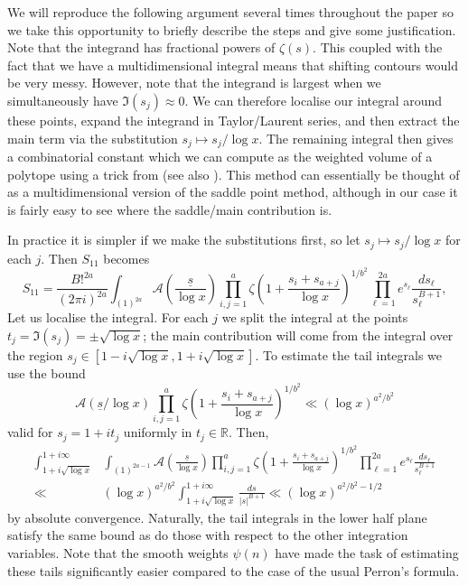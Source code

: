 \documentclass[oneside, 12pt]{amsart}
\theoremstyle{definition}
\newcommand{\mc}{\mathcal}
\newcommand{\ul}{\underline}
\begin{document}
We will reproduce the following argument several times throughout the paper so we take this opportunity to briefly describe the steps and give some justification. Note that the integrand has fractional powers of $\zeta(s)$. This coupled with the fact that we have a multidimensional integral means that shifting contours would be very messy. However, note that the integrand is largest when we simultaneously have  $\Im(s_j)\approx 0$. We can therefore localise our integral around these points, expand the integrand in Taylor/Laurent series, and then extract the main term via the substitution $s_j\mapsto s_j/\log x$. The remaining integral then gives a combinatorial constant which we can compute as the weighted volume of a polytope using a trick from \cite{BH} (see also \cite{HL}). This method can essentially be thought of as a multidimensional version of the saddle point method, although in our case it is fairly easy to see where the saddle/main contribution is.

In practice it is simpler if we make the substitutions first, so let $s_j\mapsto s_j/\log x$ for each $j$. Then $ S_{11}$ becomes
\[
 S_{11}=\frac{B!^{2a}}{(2\pi i)^{2a}}\int_{(1)^{2a}}
  \mc{A}(\frac{\ul{s}}{\log x}) 
 \prod_{i,j=1}^a\zeta\left(1+\frac{s_i+s_{a+j}}{\log x}\right)^{1/b^2} 
 \prod_{\ell=1}^{2a}e^{s_\ell}\frac{ds_\ell}{s_\ell^{B+1}},  
\]
Let us localise the integral. For each $j$ we split the integral at the points $t_j=\Im(s_j)=\pm\sqrt{\log x}$; the main contribution will come from the integral over the region $s_j\in [1 - i\sqrt{\log x}, 1 + i\sqrt{\log x}]$. To estimate the tail integrals we use the bound
\[
 \mc{A}(\ul{s}/\log x)\prod_{i,j=1}^a \zeta\left(1+\frac{s_i+s_{a+j}}{\log x}\right)^{1/b^2}\ll (\log x)^{a^2/b^2}
\]
valid for $s_j=1+it_j$ uniformly in $t_j\in\mathbb{R}$. Then,
\begin{align*}
 \int_{1+i\sqrt{\log x}}^{1+i\infty} & \int_{(1)^{2a-1}}
  \mc{A}(\frac{\ul{s}}{\log x}) \prod_{i,j=1}^a\zeta\left(1+\frac{s_i+s_{a+j}}{\log x}\right)^{1/b^2} \prod_{\ell=1}^{2a}e^{s_\ell}\frac{ds_\ell}{s_\ell^{B+1}}
\\
\ll &
(\log x)^{a^2/b^2}\int_{1+i\sqrt{\log x}}^{1+i\infty}\frac{ds}{|s|^{B+1}}\ll (\log x)^{a^2/b^2-1/2}
\end{align*}
by absolute convergence. Naturally, the tail integrals in the lower half plane satisfy the same bound as do those with respect to the other integration variables. Note that the smooth weights $\psi(n)$ have made the task of estimating these tails significantly easier compared to the case of the usual Perron's formula. 
\end{document}

